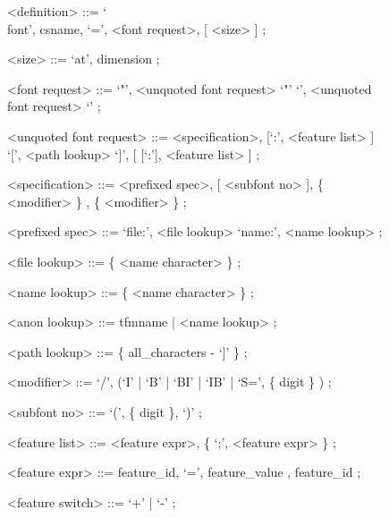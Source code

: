 \begin {figure} [b]
  \setlength{}
  \setlength\grammarindent{5cm}
  \begingroup
    \small
    \begin{grammar}
      <definition>      ::= `\\font', {\sc csname}, `=', <font request>, [ <size> ] ;

      <size>            ::= `at', {\sc dimension} ;

      <font request>    ::= `"', <unquoted font request> `"'
      \alt                  `{', <unquoted font request> `}'
       ;

      <unquoted font request> ::= <specification>, [`:', <feature list> ]
      \alt                        `[', <path lookup> `]', [ [`:'], <feature list> ] ;

      <specification>    ::= <prefixed spec>, [ <subfont no> ], \{ <modifier> \}
      , \{ <modifier> \} ;

      <prefixed spec>    ::= `file:', <file lookup>
      \alt                   `name:', <name lookup> ;

      <file lookup>      ::= \{ <name character> \} ;

      <name lookup>      ::= \{ <name character> \} ;

      <anon lookup>      ::= {\sc tfmname} | <name lookup> ;

      <path lookup>      ::= \{ {\sc all_characters} - `]' \} ;

      <modifier>         ::= `/', (`I' | `B' | `BI' | `IB' | `S=', \{ {\sc digit} \} ) ;

      <subfont no>       ::= `(', \{ {\sc digit} \}, `)' ;

      <feature list>     ::= <feature expr>, \{ `;', <feature expr> \} ;

      <feature expr>     ::= {\sc feature_id}, `=', {\sc feature_value}
      , {\sc feature_id} ;

      <feature switch>   ::= `+' | `-' ;


\end{grammar}
\end{figure}
